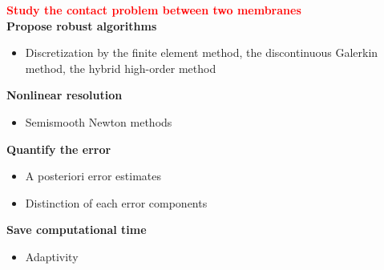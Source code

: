 \begin{frame}
\vspace*{0.1 cm}
\textcolor{red}{\textbf{Study the contact problem between two membranes}}
\\
\vspace{0.3 cm}
\textcolor{cadmiumgreen}{\textbf{Propose robust algorithms}}
\begin{itemize}
\item Discretization by the finite element method, the discontinuous Galerkin method, the hybrid high-order method
\end{itemize}
\textcolor{cadmiumgreen}{\textbf{Nonlinear resolution}}
\begin{itemize}
\item Semismooth Newton methods
  \end{itemize}
\textcolor{cadmiumgreen}{\textbf{Quantify the error}}
\begin{itemize}
  \item A posteriori error estimates
  \item Distinction of each error components
\end{itemize}

\textcolor{cadmiumgreen}{\textbf{Save computational time}}
\begin{itemize}
\item Adaptivity
  \end{itemize}
\end{frame}
